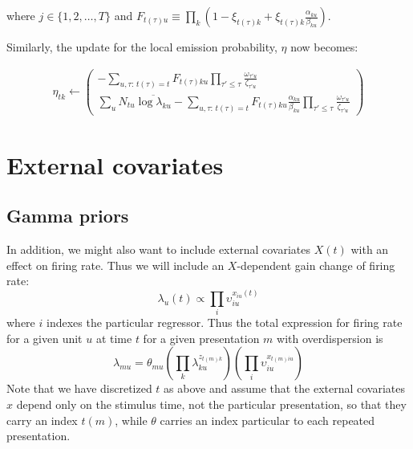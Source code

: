 \documentclass[11pt]{article}
\begin{document}
where $j \in \{1, 2, \ldots, T \}$ and $F_{t(\tau)u} \equiv \prod_k \left( 1 - \xi_{t(\tau)k} + \xi_{t(\tau)k} \frac{\alpha_{ku}}{\beta_{ku}} \right)$.

Similarly, the update for the local emission probability, $\eta$ now becomes:

\begin{align*}
    \eta_{tk} \leftarrow
    \begin{pmatrix}
        -\sum_{u, \tau: \, t(\tau) = t} F_{t(\tau)ku} \prod_{\tau' \le \tau}\frac{\omega_{\tau' u}}{\zeta_{\tau' u}} \\
        \sum_u N_{tu} \overline{\log \lambda_{ku}} - \sum_{u, \tau: \, t(\tau) = t} F_{t(\tau)ku} \frac{\alpha_{ku}}{\beta_{ku}} \prod_{\tau' \le \tau}\frac{\omega_{\tau' u}}{\zeta_{\tau' u}}
    \end{pmatrix}
\end{align*}

\section{External covariates}
\subsection{Gamma priors}
In addition, we might also want to include external covariates $X(t)$ with an effect on firing rate. Thus we will include an $X$-dependent gain change of firing rate:
\begin{equation}
    \lambda_{u}(t) \propto \prod_i \upsilon_{iu}^{x_{iu}(t)}
\end{equation}
where $i$ indexes the particular regressor. Thus the total expression for firing rate for a given unit $u$ at time $t$ for a given presentation $m$ with overdispersion is
\begin{equation}
    \lambda_{mu} = \theta_{mu}\left(\prod_k \lambda_{ku}^{z_{t(m)k}} \right) \left(\prod_i \upsilon_{iu}^{x_{t(m)iu}} \right)
\end{equation}
Note that we have discretized $t$ as above and assume that the external covariates $x$ depend only on the stimulus time, not the particular presentation, so that they carry an index $t(m)$, while $\theta$ carries an index particular to each repeated presentation.
\end{document}
